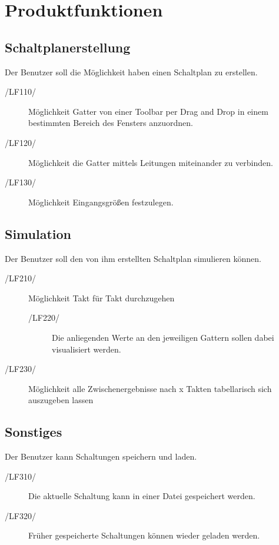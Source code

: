 
\section{Produktfunktionen}


\subsection{Schaltplanerstellung}

Der Benutzer soll die Möglichkeit haben einen Schaltplan zu erstellen.
\begin{description}
	\item[/LF110/] Möglichkeit Gatter von einer Toolbar per Drag and Drop in einem bestimmten Bereich des Fensters anzuordnen.
	\item[/LF120/] Möglichkeit die Gatter mittels Leitungen miteinander zu verbinden.
	\item[/LF130/] Möglichkeit Eingangsgrößen festzulegen.
\end{description}

\subsection{Simulation}

Der Benutzer soll den von ihm erstellten Schaltplan simulieren können. 
\begin{description}
	\item[/LF210/] Möglichkeit Takt für Takt durchzugehen
	\begin{description}
		\item[/LF220/] Die anliegenden Werte an den jeweiligen Gattern sollen dabei visualisiert werden.
	\end{description}
	\item[/LF230/] Möglichkeit alle Zwischenergebnisse nach x Takten tabellarisch sich auszugeben lassen
\end{description}

\subsection{Sonstiges}
Der Benutzer kann Schaltungen speichern und laden.
\begin{description}
	\item[/LF310/] Die aktuelle Schaltung kann in einer Datei gespeichert werden.
	\item[/LF320/] Früher gespeicherte Schaltungen können wieder geladen werden.
\end{description}
